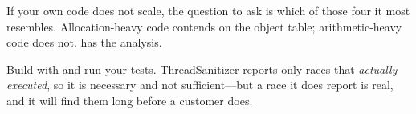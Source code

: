 If your own code does not scale, the question to ask is which of those four it
most resembles. Allocation-heavy code contends on the object table;
arithmetic-heavy code does not.  has the analysis.

\begin{stnote}
Build with  and run your tests. ThreadSanitizer reports only races
that \emph{actually executed}, so it is necessary and not sufficient---but a
race it does report is real, and it will find them long before a customer
does.
\end{stnote}
